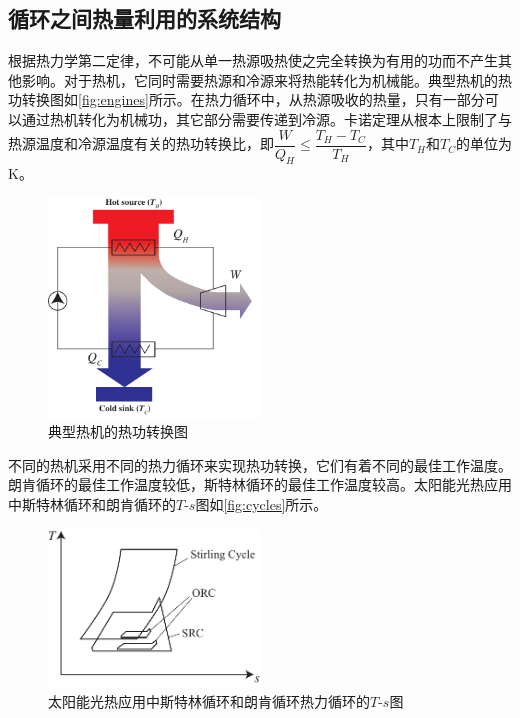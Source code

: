 \subsection{循环之间热量利用的系统结构}
\label{sec:HRBC}

根据热力学第二定律，不可能从单一热源吸热使之完全转换为有用的功而不产生其他影响。对于热机，它同时需要热源和冷源来将热能转化为机械能。典型热机的热功转换图如\autoref{fig:engines}所示。在热力循环中，从热源吸收的热量，只有一部分可以通过热机转化为机械功，其它部分需要传递到冷源。卡诺定理从根本上限制了与热源温度和冷源温度有关的热功转换比，即$\dfrac{W}{Q_H} \leqslant \dfrac{T_H - T_C}{T_H}$，其中$T_H$和$T_C$的单位为$\mathrm{K}$。
\begin{figure}[htb]
\centering 
\includegraphics[width=0.5\textwidth]{fig/engines}
\caption{典型热机的热功转换图}
\label{fig:engines}
\end{figure}

不同的热机采用不同的热力循环来实现热功转换，它们有着不同的最佳工作温度。朗肯循环的最佳工作温度较低，斯特林循环的最佳工作温度较高。太阳能光热应用中斯特林循环和朗肯循环的$T$-$s$图如\autoref{fig:cycles}所示。
\begin{figure}[htb]
\centering 
\includegraphics[width=0.5\textwidth]{fig/cycles}
\caption{太阳能光热应用中斯特林循环和朗肯循环热力循环的$T$-$s$图}\label{fig:cycles}
\end{figure}

